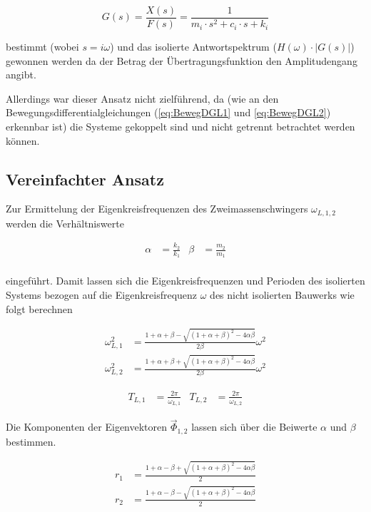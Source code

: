 \begin{equation} \label{laplace2}
G(s)=\frac{X(s)}{F(s)} = \frac{1}{m_i \cdot s^2 + c_i \cdot s + k_i}
\end{equation}

bestimmt (wobei $s = i \omega$) und das isolierte Antwortspektrum ($H(\omega) \cdot |G(s)|$) gewonnen werden da der Betrag der Übertragungsfunktion den Amplitudengang angibt.

Allerdings war dieser Ansatz nicht zielführend, da (wie an den Bewegungsdifferentialgleichungen (\cref{eq:BewegDGL1} und \cref{eq:BewegDGL2}) erkennbar ist) die Systeme gekoppelt sind und nicht getrennt betrachtet werden können.

\subsection{Vereinfachter Ansatz}
\label{sec:ansatzvereinfacht}

Zur Ermittelung der Eigenkreisfrequenzen des Zweimassenschwingers $\omega_{L,1,2}$ werden die Verhältniswerte

\begin{align}
\alpha &= \frac{k_2}{k_1} & \beta  &= \frac{m_2}{m_1} \\
\end{align}

eingeführt. Damit lassen sich die Eigenkreisfrequenzen und Perioden des isolierten Systems bezogen auf die Eigenkreisfrequenz $\omega$ des nicht isolierten Bauwerks wie folgt berechnen \cite{Pocanschi} \cite{Isemann}

\begin{align}
\omega_{L,1}^2 &= \frac{1 + \alpha + \beta - \sqrt{(1 + \alpha + \beta)^2 - 4 \alpha \beta}}{2 \beta} \omega^2\\
\omega_{L,2}^2 &= \frac{1 + \alpha + \beta + \sqrt{(1 + \alpha + \beta)^2 - 4 \alpha \beta}}{2 \beta} \omega^2
\end{align}

\begin{align}
T_{L,1} &= \frac{2 \pi}{\omega_{L,1}} & T_{L,2} &= \frac{2 \pi}{\omega_{L,2}}
\end{align}

Die Komponenten der Eigenvektoren $\vec{\Phi}_{1,2}$ lassen sich über die Beiwerte $\alpha$ und $\beta$ bestimmen.

\begin{align}
r_1 &= \frac{1 + \alpha - \beta + \sqrt{(1 + \alpha + \beta)^2 - 4 \alpha \beta}}{2}\\
r_2 &= \frac{1 + \alpha - \beta - \sqrt{(1 + \alpha + \beta)^2 - 4 \alpha \beta}}{2}
\end{align}

